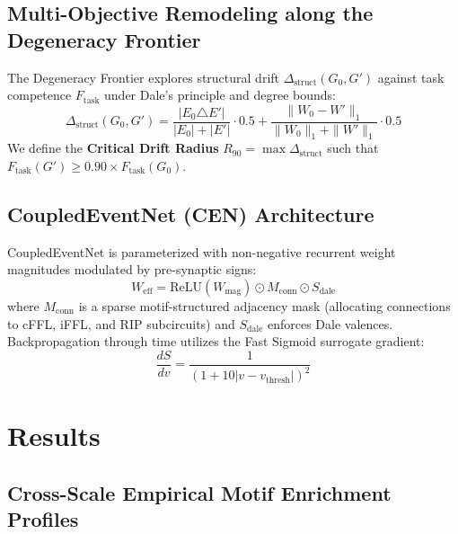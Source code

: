 \documentclass[10pt,twocolumn,letterpaper]{article}
\begin{document}
\subsection{Multi-Objective Remodeling along the Degeneracy Frontier}
The Degeneracy Frontier explores structural drift $\Delta_{\mathrm{struct}}(G_0, G')$ against task competence $F_{\mathrm{task}}$ under Dale's principle and degree bounds:
\begin{equation}
\Delta_{\mathrm{struct}}(G_0, G') = \frac{|E_0 \triangle E'|}{|E_0| + |E'|} \cdot 0.5 + \frac{\|W_0 - W'\|_1}{\|W_0\|_1 + \|W'\|_1} \cdot 0.5
\end{equation}
We define the \textbf{Critical Drift Radius} $R_{90} = \max \Delta_{\mathrm{struct}}$ such that $F_{\mathrm{task}}(G') \ge 0.90 \times F_{\mathrm{task}}(G_0)$.

\subsection{CoupledEventNet (CEN) Architecture}
CoupledEventNet is parameterized with non-negative recurrent weight magnitudes modulated by pre-synaptic signs:
\begin{equation}
W_{\mathrm{eff}} = \mathrm{ReLU}(W_{\mathrm{mag}}) \odot M_{\mathrm{conn}} \odot S_{\mathrm{dale}}
\end{equation}
where $M_{\mathrm{conn}}$ is a sparse motif-structured adjacency mask (allocating connections to cFFL, iFFL, and RIP subcircuits) and $S_{\mathrm{dale}}$ enforces Dale valences. Backpropagation through time utilizes the Fast Sigmoid surrogate gradient:
\begin{equation}
\frac{dS}{dv} = \frac{1}{(1 + 10|v - v_{\mathrm{thresh}}|)^2}
\end{equation}

\section{Results}

\subsection{Cross-Scale Empirical Motif Enrichment Profiles}
\end{document}
